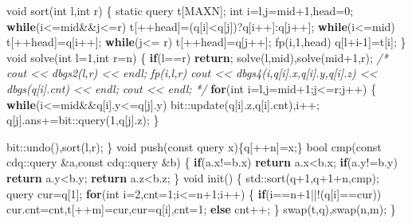 \documentclass[
]{article}
\newenvironment{Shaded}{}{}
\newcommand{\AttributeTok}[1]{\textcolor[rgb]{0.49,0.56,0.16}{#1}}
\newcommand{\BuiltInTok}[1]{#1}
\newcommand{\CommentTok}[1]{\textcolor[rgb]{0.38,0.63,0.69}{\textit{#1}}}
\newcommand{\ControlFlowTok}[1]{\textcolor[rgb]{0.00,0.44,0.13}{\textbf{#1}}}
\newcommand{\DataTypeTok}[1]{\textcolor[rgb]{0.56,0.13,0.00}{#1}}
\newcommand{\DecValTok}[1]{\textcolor[rgb]{0.25,0.63,0.44}{#1}}
\newcommand{\NormalTok}[1]{#1}
\begin{document}
\begin{Shaded}
\begin{Highlighting}[]
    \DataTypeTok{void}\NormalTok{ sort(}\DataTypeTok{int}\NormalTok{ l,}\DataTypeTok{int}\NormalTok{ r)}
\NormalTok{    \{}
        \AttributeTok{static}\NormalTok{ query t[MAXN];}
        \DataTypeTok{int}\NormalTok{ i=l,j=mid+}\DecValTok{1}\NormalTok{,head=}\DecValTok{0}\NormalTok{;}
        \ControlFlowTok{while}\NormalTok{(i\textless{}=mid\&\&j\textless{}=r) t[++head]=(q[i]\textless{}q[j])?q[i++]:q[j++];}
        \ControlFlowTok{while}\NormalTok{(i\textless{}=mid) t[++head]=q[i++];}
        \ControlFlowTok{while}\NormalTok{(j\textless{}=  r) t[++head]=q[j++];}
\NormalTok{        fp(i,}\DecValTok{1}\NormalTok{,head) q[l+i{-}}\DecValTok{1}\NormalTok{]=t[i];}
\NormalTok{    \}}
    \DataTypeTok{void}\NormalTok{ solve(}\DataTypeTok{int}\NormalTok{ l=}\DecValTok{1}\NormalTok{,}\DataTypeTok{int}\NormalTok{ r=n)}
\NormalTok{    \{}
        \ControlFlowTok{if}\NormalTok{(l==r) }\ControlFlowTok{return}\NormalTok{;}
\NormalTok{        solve(l,mid),solve(mid+}\DecValTok{1}\NormalTok{,r);}
\CommentTok{/*}
\CommentTok{        cout \textless{}\textless{} dbgs2(l,r) \textless{}\textless{} endl;}
\CommentTok{        fp(i,l,r) cout \textless{}\textless{} dbgs4(i,q[i].x,q[i].y,q[i].z) \textless{}\textless{} dbgs(q[i].cnt) \textless{}\textless{} endl;}
\CommentTok{        cout \textless{}\textless{} endl;}
\CommentTok{*/}
        \ControlFlowTok{for}\NormalTok{(}\DataTypeTok{int}\NormalTok{ i=l,j=mid+}\DecValTok{1}\NormalTok{;j\textless{}=r;j++)}
\NormalTok{        \{}
            \ControlFlowTok{while}\NormalTok{(i\textless{}=mid\&\&q[i].y\textless{}=q[j].y)}
\NormalTok{                bit::update(q[i].z,q[i].cnt),i++;}
\NormalTok{            q[j].ans+=bit::query(}\DecValTok{1}\NormalTok{,q[j].z);}
\NormalTok{        \}}

\NormalTok{        bit::undo(),sort(l,r);}
\NormalTok{    \}}
    \DataTypeTok{void}\NormalTok{ push(}\AttributeTok{const}\NormalTok{ query x)\{q[++n]=x;\}}
    \DataTypeTok{bool}\NormalTok{ cmp(}\AttributeTok{const}\NormalTok{ cdq::query \&a,}\AttributeTok{const}\NormalTok{ cdq::query \&b)}
\NormalTok{    \{}
        \ControlFlowTok{if}\NormalTok{(a.x!=b.x) }\ControlFlowTok{return}\NormalTok{ a.x\textless{}b.x;}
        \ControlFlowTok{if}\NormalTok{(a.y!=b.y) }\ControlFlowTok{return}\NormalTok{ a.y\textless{}b.y;}
        \ControlFlowTok{return}\NormalTok{ a.z\textless{}b.z;}
\NormalTok{    \}}
    \DataTypeTok{void}\NormalTok{ init()}
\NormalTok{    \{}
        \BuiltInTok{std::}\NormalTok{sort(q+}\DecValTok{1}\NormalTok{,q+}\DecValTok{1}\NormalTok{+n,cmp);}
\NormalTok{        query cur=q[}\DecValTok{1}\NormalTok{];}
        \ControlFlowTok{for}\NormalTok{(}\DataTypeTok{int}\NormalTok{ i=}\DecValTok{2}\NormalTok{,cnt=}\DecValTok{1}\NormalTok{;i\textless{}=n+}\DecValTok{1}\NormalTok{;i++)}
\NormalTok{        \{}
            \ControlFlowTok{if}\NormalTok{(i==n+}\DecValTok{1}\NormalTok{||!(q[i]==cur))}
\NormalTok{                cur.cnt=cnt,t[++m]=cur,cur=q[i],cnt=}\DecValTok{1}\NormalTok{;}
            \ControlFlowTok{else}\NormalTok{ cnt++;}
\NormalTok{        \}}
\NormalTok{        swap(t,q),swap(n,m);}
\NormalTok{    \}}


\end{Highlighting}
\end{Shaded}
\end{document}
